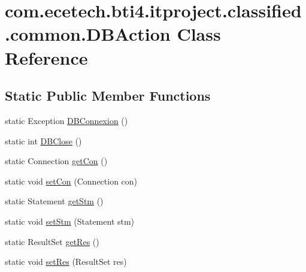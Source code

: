 \hypertarget{classcom_1_1ecetech_1_1bti4_1_1itproject_1_1classified_1_1common_1_1_d_b_action}{}\section{com.\+ecetech.\+bti4.\+itproject.\+classified.\+common.\+D\+B\+Action Class Reference}
\label{classcom_1_1ecetech_1_1bti4_1_1itproject_1_1classified_1_1common_1_1_d_b_action}
\subsection*{Static Public Member Functions}
\begin{DoxyCompactItemize}
\item 
static Exception \hyperlink{classcom_1_1ecetech_1_1bti4_1_1itproject_1_1classified_1_1common_1_1_d_b_action_a03b522e1388500132c0de54ad5ba35da}{D\+B\+Connexion} ()
\item 
static int \hyperlink{classcom_1_1ecetech_1_1bti4_1_1itproject_1_1classified_1_1common_1_1_d_b_action_a9e2f615b938168702c83370c13f629ad}{D\+B\+Close} ()
\item 
static Connection \hyperlink{classcom_1_1ecetech_1_1bti4_1_1itproject_1_1classified_1_1common_1_1_d_b_action_a5831883b0b490e9528f2604904610dbe}{get\+Con} ()
\item 
static void \hyperlink{classcom_1_1ecetech_1_1bti4_1_1itproject_1_1classified_1_1common_1_1_d_b_action_a1229309e09cf59bc09814488e449608e}{set\+Con} (Connection con)
\item 
static Statement \hyperlink{classcom_1_1ecetech_1_1bti4_1_1itproject_1_1classified_1_1common_1_1_d_b_action_acbac8f8d13d537ed7be8553809762134}{get\+Stm} ()
\item 
static void \hyperlink{classcom_1_1ecetech_1_1bti4_1_1itproject_1_1classified_1_1common_1_1_d_b_action_a6aedd826db70e9c3736ca969599c1d43}{set\+Stm} (Statement stm)
\item 
static Result\+Set \hyperlink{classcom_1_1ecetech_1_1bti4_1_1itproject_1_1classified_1_1common_1_1_d_b_action_ae8cb329cdf28bc94217b723b422491be}{get\+Res} ()
\item 
static void \hyperlink{classcom_1_1ecetech_1_1bti4_1_1itproject_1_1classified_1_1common_1_1_d_b_action_a86c0a551394ed96766b38cd4117d49f4}{set\+Res} (Result\+Set res)
\end{DoxyCompactItemize}


